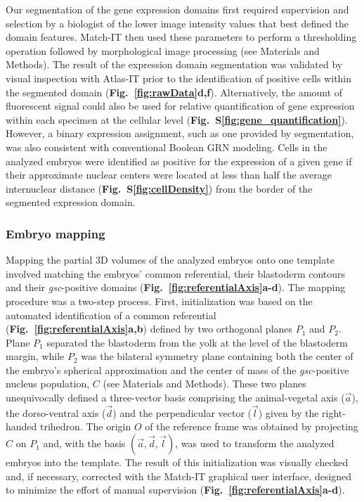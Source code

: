 Our segmentation of the gene expression domains first required supervision and selection by a biologist of the lower image intensity values that best defined the domain features. Match-IT then used these parameters to perform a thresholding operation followed by morphological image processing (see Materials and Methods). The result of the expression domain segmentation was validated by visual inspection with Atlas-IT prior to the identification of positive cells within the segmented domain (\textbf{Fig.~\ref{fig:rawData}d,f}). Alternatively, the amount of fluorescent signal could also be used for relative quantification of gene expression within each specimen at the cellular level (\textbf{Fig.~S\ref{fig:gene_quantification}}). However, a binary expression assignment, such as one provided by segmentation, was also consistent with conventional Boolean GRN modeling\cite{peter2012predictive}. Cells in the analyzed embryos were identified as positive for the expression of a given gene if their approximate nuclear centers were located at less than half the average internuclear distance (\textbf{Fig.~S\ref{fig:cellDensity}}) from the border of the segmented expression domain.

\subsubsection*{Embryo mapping}

Mapping the partial 3D volumes of the analyzed embryos onto one template involved matching the embryos' common referential, their blastoderm contours and their \emph{gsc}-positive domains (\textbf{Fig.~\ref{fig:referentialAxis}a-d}). The mapping procedure was a two-step process. First, initialization was based on the automated identification of a common referential (\textbf{Fig.~\ref{fig:referentialAxis}a,b}) defined by two orthogonal planes $P_1$ and $P_2$. Plane $P_1$ separated the blastoderm from the yolk at the level of the blastoderm margin, while $P_2$ was the bilateral symmetry plane containing both the center of the embryo's spherical approximation and the center of mass of the \emph{gsc}-positive nucleus population, $C$ (see Materials and Methods). These two planes unequivocally defined a three-vector basis comprising the animal-vegetal axis ($\vec{a}$), the dorso-ventral axis ($\vec{d}$) and the perpendicular vector ($\vec{l}$) given by the right-handed trihedron. The origin $O$ of the reference frame was obtained by projecting $C$ on $P_1$ and, with the basis $(\vec{a},\vec{d},\vec{l})$, was used to transform the analyzed embryos into the template. The result of this initialization was visually checked and, if necessary, corrected with the Match-IT graphical user interface, designed to minimize the effort of manual supervision (\textbf{Fig.~\ref{fig:referentialAxis}a-d}).


